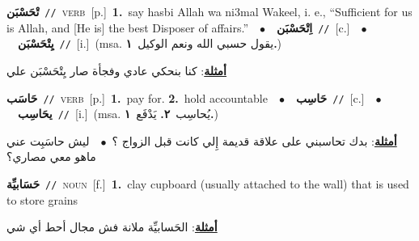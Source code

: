 \documentclass[10pt,a4paper,twoside]{article} %
\begin{document}
\begin{multicols}{2}
{\setlength\topsep{0pt}\textbf{\foreignlanguage{arabic}{تْحَسْبَن}}\ {\color{gray}\texttt{//}\color{black}}\ \textsc{verb}\ [p.]\ \textbf{1.}~say hasbi Allah wa ni3mal Wakeel, i. e., “Sufficient for us is Allah, and [He is] the best Disposer of affairs.”\ \ $\bullet$\ \ \setlength\topsep{0pt}\textbf{\foreignlanguage{arabic}{اِتْحَسْبَن}}\ {\color{gray}\texttt{//}\color{black}}\ [c.]\ \ $\bullet$\ \ \setlength\topsep{0pt}\textbf{\foreignlanguage{arabic}{يِتْحَسْبَن}}\ {\color{gray}\texttt{//}\color{black}}\ [i.]\ \color{gray}(msa. \foreignlanguage{arabic}{يقول حسبي الله ونعم الوكيل}~\foreignlanguage{arabic}{\textbf{١.}})\color{black}\  \begin{flushright}\color{gray}\foreignlanguage{arabic}{\textbf{\underline{\foreignlanguage{arabic}{أمثلة}}}: كنا بنحكي عادي وفجأة صار يِتْحَسْبَن علي}\end{flushright}\color{black}} \vspace{2mm}

{\setlength\topsep{0pt}\textbf{\foreignlanguage{arabic}{حَاسَب}}\ {\color{gray}\texttt{//}\color{black}}\ \textsc{verb}\ [p.]\ \textbf{1.}~pay for.  \textbf{2.}~hold accountable\ \ $\bullet$\ \ \setlength\topsep{0pt}\textbf{\foreignlanguage{arabic}{حَاسِب}}\ {\color{gray}\texttt{//}\color{black}}\ [c.]\ \ $\bullet$\ \ \setlength\topsep{0pt}\textbf{\foreignlanguage{arabic}{يحَاسِب}}\ {\color{gray}\texttt{//}\color{black}}\ [i.]\ \color{gray}(msa. \foreignlanguage{arabic}{يُحاسِب}~\foreignlanguage{arabic}{\textbf{٢.}}  \foreignlanguage{arabic}{يَدْفَع}~\foreignlanguage{arabic}{\textbf{١.}})\color{black}\  \begin{flushright}\color{gray}\foreignlanguage{arabic}{\textbf{\underline{\foreignlanguage{arabic}{أمثلة}}}: بدك تحاسبني على علاقة قديمة إِلي كانت قبل الزواج ؟\ $\bullet$\ \  ليش حاسَبِت عني ماهو معي مصاري؟}\end{flushright}\color{black}} \vspace{2mm}

{\setlength\topsep{0pt}\textbf{\foreignlanguage{arabic}{حَسَابيِّة}}\ {\color{gray}\texttt{//}\color{black}}\ \textsc{noun}\ [f.]\ \textbf{1.}~clay cupboard (usually attached to the wall) that is used to store grains\  \begin{flushright}\color{gray}\foreignlanguage{arabic}{\textbf{\underline{\foreignlanguage{arabic}{أمثلة}}}: الحَسابيِّة ملانة فش مجال أحط أي شي}\end{flushright}\color{black}} \vspace{2mm}


\end{multicols}
\end{document}
